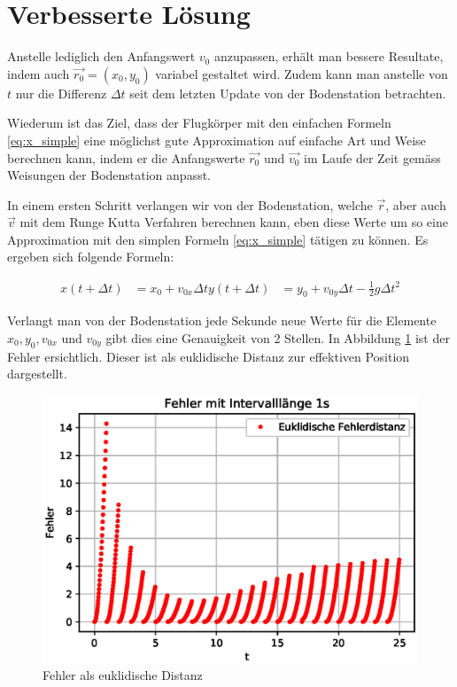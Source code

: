\section{Verbesserte Lösung
\label{perturbation:section:verbesserte_loesung}}

Anstelle lediglich den Anfangswert $v_0$ anzupassen, erhält man bessere Resultate, indem auch $\vec{r_0} = (x_0, y_0)$ variabel gestaltet wird. 
Zudem kann man anstelle von $t$ nur die Differenz $\Delta t$ seit dem letzten Update von der Bodenstation betrachten.

Wiederum ist das Ziel, dass der Flugkörper mit den einfachen Formeln \eqref{eq:x_simple} eine möglichst gute Approximation auf einfache Art und Weise berechnen kann, indem er die Anfangswerte $\vec{r_0}$ und $\vec{v_0}$ im Laufe der Zeit gemäss Weisungen der Bodenstation anpasst.

In einem ersten Schritt verlangen wir von der Bodenstation, welche $\vec{r}$, aber auch $\vec{v}$ mit dem Runge Kutta Verfahren berechnen kann, eben diese Werte um so eine Approximation mit den simplen Formeln \eqref{eq:x_simple} tätigen zu können. Es ergeben sich folgende Formeln:

\begin{equation}
\begin{aligned}
x(t + \Delta t) &= x_0 + v_{0x}\Delta t
y(t + \Delta t) &= y_0 + v_{0y}\Delta t - \frac{1}{2}g\Delta t^2
\end{aligned}
\end{equation}

Verlangt man von der Bodenstation jede Sekunde neue Werte für die Elemente $x_0, y_0, v_{0x}$ und $v_{0y}$ gibt dies eine Genauigkeit von 2 Stellen. In Abbildung \ref{error} ist der Fehler ersichtlich. Dieser ist als euklidische Distanz zur effektiven Position dargestellt.

\begin{figure}
    \centering
    \includegraphics[scale = 0.7]{papers/perturbation/bilder/perturbation_fig3.eps}
    \caption{Fehler als euklidische Distanz}
	\label{error}
\end{figure}